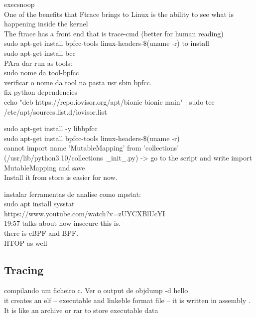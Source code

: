 \documentclass[11pt, a4paper, oneside]{article}
\theoremstyle{definition}
\begin{document}
execsnoop\\

One of the benefits that Ftrace brings to Linux is the ability to see what is happening inside the kernel\\
The ftrace has a front end that is trace-cmd (better for human reading)\\
sudo apt-get install bpfcc-tools linux-headers-$\$$(uname -r) to install\\
sudo apt-get install bcc\\


PAra dar run as tools:\\
sudo nome da tool-bpfcc\\

verificar o nome da tool na pasta usr sbin bpfcc.\\

fix python dependencies\\

echo "deb https://repo.iovisor.org/apt/bionic bionic main" | sudo tee /etc/apt/sources.list.d/iovisor.list

sudo apt-get install -y libbpfcc\\

sudo apt-get install bpfcc-tools linux-headers-$\$$(uname -r)\\

cannot import name 'MutableMapping' from 'collections' (/usr/lib/python3.10/collections\ $\_\_$init$\_\_$.py) -> go to the script and write import MutableMapping and save\\

Install it from store is easier for now. 

instalar ferramentas de analise como mpstat:\\
sudo apt install sysstat\\

https://www.youtube.com/watch?v=zUYCXBlUcYI\\
19:57 talks about how insecure this is.\\
there is eBPF and BPF.\\

HTOP as well\\

\subsection{Tracing}
compilando um ficheiro c. Ver o output de objdump -d hello\\
it creates an elf -- executable and linkeble format file -- it is written in assembly . It is like an archive or rar to store executable data
\end{document}

